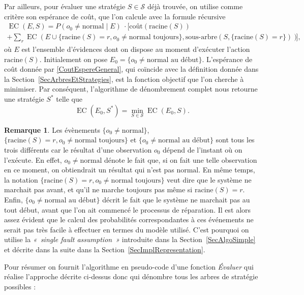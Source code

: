 \documentclass[a4paper,11pt]{article}
\theoremstyle{plain}
\theoremstyle{definition}
\newtheorem*{remk}{Remarque}
\DeclareMathOperator{\EC}{EC}
\begin{document}
Par ailleurs, pour évaluer une stratégie $S \in \mathcal S$ déjà trouvée, on utilise comme critère son espérance de coût, que l'on calcule avec la formule récursive
\begin{multline}
\label{CoutEspereGeneral}
\EC(E, S) = P(o_0 \neq \text{normal} \mid E) \: \cdot \Biggl[\text{coût}(\text{racine}(S)) \\ + \sum_{r} \EC(E \cup \{\text{racine}(S) = r, o_0 \neq \text{normal toujours}\}, \text{sous-arbre}(S, \{\text{racine}(S) = r\}))\Biggr],
\end{multline}
où $E$ est l'ensemble d'évidences dont on dispose au moment d'exécuter l'action $\text{racine}(S)$. Initialement on pose $E_0 = \{o_0 \neq \text{normal au début}\}$. L'espérance de coût donnée par \eqref{CoutEspereGeneral}, qui coïncide avec la définition donnée dans la Section~\ref{SecArbresEtStrategies}, est la fonction objectif que l'on cherche à minimiser. Par conséquent, l'algorithme de dénombrement complet nous retourne une stratégie $S^*$ telle que
\begin{equation}
\label{SolMainProblem}
\EC(E_0, S^*) = \min_{S \in \mathcal S} {\EC(E_0, S)}.
\end{equation}

\begin{remk}
Les évènements $\{o_0 \neq \text{normal}\}$, $\{\text{racine}(S) = r, o_0 \neq \text{normal toujours}\}$ et $\{o_0 \neq \text{normal }\allowbreak\text{au }\allowbreak\text{début}\}$ sont tous les trois différents car le résultat d'une observation $o_0$ dépend de l'instant où on l'exécute. En effet, $o_0 \neq \text{normal}$ dénote le fait que, si on fait une telle observation en ce moment, on obtiendrait un résultat qui n'est pas $\text{normal}$. En même temps, la notation $\{\text{racine}(S) = r, o_0 \neq \text{normal toujours}\}$ veut dire que le système ne marchait pas avant, et qu'il ne marche toujours pas même si $\text{racine}(S) = r$. Enfin, $\{o_0 \neq \text{normal au début}\}$ décrit le fait que le système ne marchait pas au tout début, avant que l'on ait commencé le processus de réparation. Il est alors assez évident que le calcul des probabilités correspondantes à ces événements ne serait pas très facile à effectuer en termes du modèle utilisé. C'est pourquoi on utilise la \emph{«~single fault assumption~»} introduite dans la Section~\ref{SecAlgoSimple} et décrite dans la suite dans la Section~\ref{SecImplRepresentation}.
\end{remk}

Pour résumer on fournit l'algorithme en pseudo-code d'une fonction \emph{Évaluer} qui réalise l'approche décrite ci-dessus donc qui dénombre tous les arbres de stratégie possibles :
\end{document}
